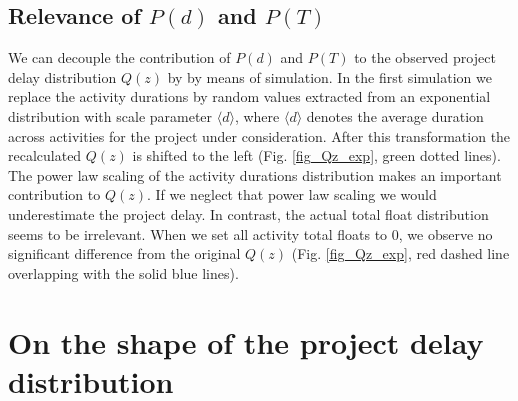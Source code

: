 \documentclass[11pt]{article}
\begin{document}
\subsection{Relevance of $P(d)$ and $P(T)$}

We can decouple the contribution of $P(d)$ and $P(T)$ to the observed project delay distribution $Q(z)$ by by means of simulation. In the first simulation we replace the activity durations by random values extracted from an exponential distribution with scale parameter $\langle d\rangle$, where $\langle d\rangle$ denotes the average duration across activities for the project under consideration. After this transformation the recalculated $Q(z)$ is shifted to the left (Fig. \ref{fig_Qz_exp}, green dotted lines). The power law scaling of the activity durations distribution makes an important contribution to $Q(z)$. If we neglect that power law scaling we would underestimate the project delay. In contrast, the actual total float distribution seems to be irrelevant. When we set all activity total floats to 0, we observe no significant difference from the original $Q(z)$ (Fig. \ref{fig_Qz_exp}, red dashed line overlapping with the solid blue lines).

\section{On the shape of the project delay distribution}
\end{document}

